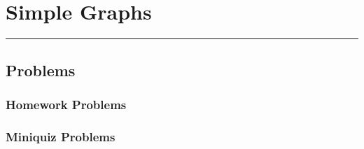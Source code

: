 %
%
%
%
%


\newcommand{\embed}[1]{\mathcal{#1}}

\usenotesproblems
\renewcommand{\linput}[1]{}

\chapter{Simple Graphs}

\instatements{\linput{Section0500}}

\instatements{\linput{Section0501}}
\startclassproblems
{}

\instatements{\linput{Section0502}}
\startclassproblems

\instatements{\linput{Section0503}}
\startclassproblems

\instatements{\linput{Section0504}}
\startclassproblems

\instatements{\linput{Section0505}}
\startclassproblems

\instatements{\linput{Section0506}}
\startclassproblems

\instatements{\linput{Section0507}}

\rule{\textwidth}{0.01in}\par
\nointerlineskip
\section{Problems}

\subsection*{Homework Problems}
\clearpage

\subsection*{Miniquiz Problems}
\clearpage

\endinput